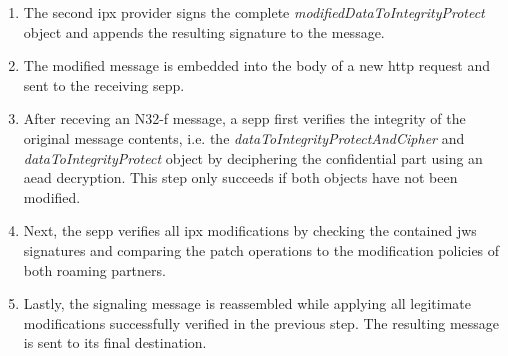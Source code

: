 \begin{enumerate}[wide, labelwidth=!, labelindent=0pt]
    \item The second \gls{ipx} provider signs the complete \textit{modifiedDataToIntegrityProtect} object and appends the resulting signature to the message.
    \item The modified message is embedded into the body of a new \gls{http} request and sent to the receiving \gls{sepp}.
    \item After receving an N32-f message, a \gls{sepp} first verifies the integrity of the original message contents, i.e. the \textit{dataToIntegrityProtectAndCipher} and \textit{dataToIntegrityProtect} object by deciphering the confidential part using an \gls{aead} decryption. This step only succeeds if both objects have not been modified.
    \item Next, the \gls{sepp} verifies all \gls{ipx} modifications by checking the contained \gls{jws} signatures and comparing the patch operations to the modification policies of both roaming partners.
    \item Lastly, the signaling message is reassembled while applying all legitimate modifications successfully verified in the previous step. The resulting message is sent to its final destination.
\end{enumerate}
